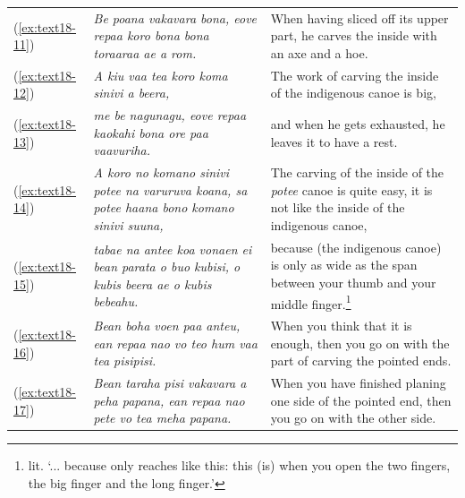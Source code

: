 \documentclass[output=paper]{langscibook}
\begin{document}
\begin{xltabular}{\textwidth}{lXX}
	(\ref{ex:text18-11})&\textit{Be poana vakavara bona, eove repaa koro bona bona toraaraa ae a rom.}&When having sliced off its upper part, he carves the inside with an axe and a hoe.\\
	(\ref{ex:text18-12})&\textit{A kiu vaa tea koro koma sinivi a beera,}&The work of carving the inside of the indigenous canoe is big,\\
	(\ref{ex:text18-13})&\textit{me be nagunagu, eove repaa kaokahi bona ore paa vaavuriha.}&and when he gets exhausted, he leaves it to have a rest.\\
	(\ref{ex:text18-14})&\textit{A koro no komano sinivi potee na varuruva koana, sa potee haana bono komano sinivi suuna,}&The carving of the inside of the \textit{potee} canoe is quite easy, it is not like the inside of the indigenous canoe,\\
	(\ref{ex:text18-15})&\textit{tabae na antee koa vonaen ei bean parata o buo kubisi, o kubis beera ae o kubis bebeahu.}&because (the indigenous canoe) is only as wide as the span between your thumb and your middle finger.\footnote{lit. `... because only reaches like this: this (is) when you open the two fingers, the big finger and the long finger.'}\\
	(\ref{ex:text18-16})&\textit{Bean boha voen paa anteu, ean repaa nao vo teo hum vaa tea pisipisi.}&When you think that it is enough, then you go on with the part of carving the pointed ends.\\
	(\ref{ex:text18-17})&\textit{Bean taraha pisi vakavara a peha papana, ean repaa nao pete vo tea meha papana.}&When you have finished planing one side of the pointed end, then you go on with the other side.\\
\end{xltabular}
\end{document}
